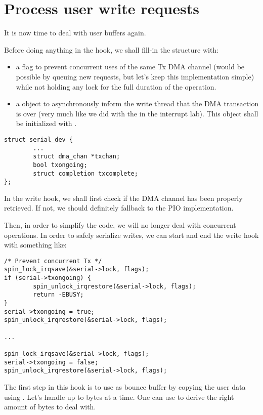 \section{Process user write requests}

It is now time to deal with user buffers again.

Before doing anything in the  hook, we shall fill-in the
 structure with:
\begin{itemize}
\item a  flag to prevent concurrent uses of the same
  Tx DMA channel (would be possible by queuing new requests, but let's keep this
  implementation simple) while not holding any lock for the full duration of
  the operation.
\item a  object to asynchronously inform the
  write thread that the DMA transaction is over (very much like we did with the
   in the interrupt lab). This object shall be initialized with
  .
\end{itemize}

\begin{verbatim}
struct serial_dev {
        ...
        struct dma_chan *txchan;
        bool txongoing;
        struct completion txcomplete;
};
\end{verbatim}

In the write hook, we shall first check if the DMA channel has been
properly retrieved. If not, we should definitely fallback to the PIO
implementation.

Then, in order to simplify the code, we will no longer deal with
concurrent operations. In order to safely serialize writes, we can start
and end the write hook with something like:

\begin{verbatim}
/* Prevent concurrent Tx */
spin_lock_irqsave(&serial->lock, flags);
if (serial->txongoing) {
        spin_unlock_irqrestore(&serial->lock, flags);
        return -EBUSY;
}
serial->txongoing = true;
spin_unlock_irqrestore(&serial->lock, flags);

...

spin_lock_irqsave(&serial->lock, flags);
serial->txongoing = false;
spin_unlock_irqrestore(&serial->lock, flags);
\end{verbatim}

The first step in this  hook is to use  as
bounce buffer by copying the user data using . Let's
handle up to  bytes at a time. One can use 
to derive the right amount of bytes to deal with.

